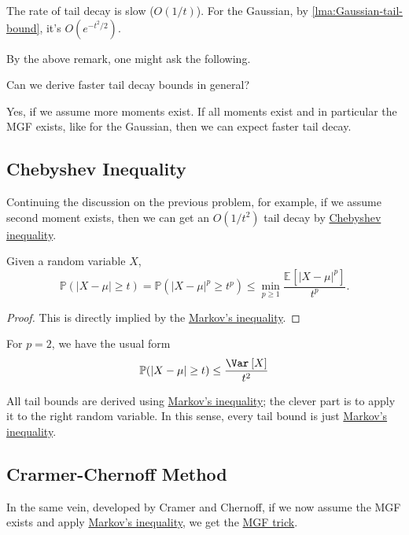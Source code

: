 \begin{remark}
	The rate of tail decay is slow (\(O(1 / t)\)). For the Gaussian, by \autoref{lma:Gaussian-tail-bound}, it's \(O(e^{-t^2 / 2})\).
\end{remark}

By the above remark, one might ask the following.

\begin{problem*}
	Can we derive faster tail decay bounds in general?
\end{problem*}
\begin{answer}
	Yes, if we assume more moments exist. If all moments exist and in particular the MGF exists, like for the Gaussian, then we can expect faster tail decay.
\end{answer}

\subsection{Chebyshev Inequality}
Continuing the discussion on the previous problem, for example, if we assume second moment exists, then we can get an \(O(1 / t^2)\) tail decay by \hyperref[lma:Chebyshev-inequality]{Chebyshev inequality}.

\begin{lemma}\label{lma:Chebyshev-inequality}
	Given a random variable \(X\),
	\[
		\mathbb{P} (\vert X - \mu  \vert \geq t ) = \mathbb{P} (\vert X - \mu  \vert^p \geq t ^p) \leq \min _{p \geq 1} \frac{\mathbb{E}_{}\left[\vert X-\mu  \vert^p \right] }{t^p}.
	\]
\end{lemma}
\begin{proof}
	This is directly implied by the \hyperref[lma:Markov-inequality]{Markov's inequality}.
\end{proof}

\begin{remark}
	For \(p = 2\), we have the usual form
	\[
		\mathbb{P} (\vert X - \mu  \vert \geq t) \leq \frac{\Var_{}\left[X \right] }{t^2}
	\]
\end{remark}

\begin{remark}
	All tail bounds are derived using \hyperref[lma:Markov-inequality]{Markov's inequality}; the clever part is to apply it to the right random variable. In this sense, every tail bound is just \hyperref[lma:Markov-inequality]{Markov's inequality}.
\end{remark}

\subsection{Crarmer-Chernoff Method}
In the same vein, developed by Cramer and Chernoff, if we now assume the MGF exists and apply \hyperref[lma:Markov-inequality]{Markov's inequality}, we get the \hyperref[lma:MGF-trick]{MGF trick}.

